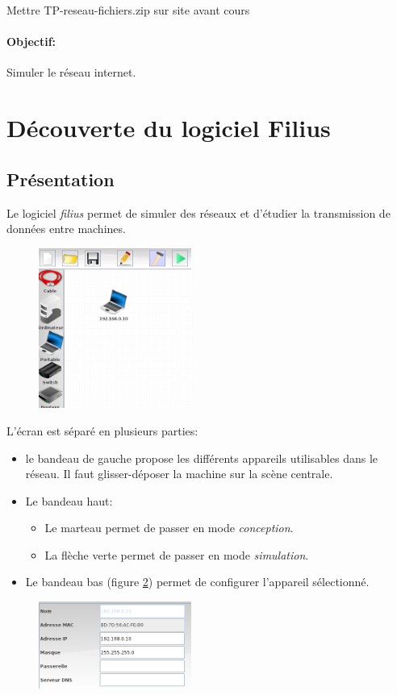 \documentclass[a4paper,11pt]{article}
\begin{document}
\begin{Form}
\begin{commentprof}
Mettre TP-reseau-fichiers.zip sur site avant cours
\end{commentprof}
\paragraph{Objectif:}Simuler le réseau internet.
\section{Découverte du logiciel Filius}
\subsection{Présentation}
Le logiciel \emph{filius} permet de simuler des réseaux et d'étudier la transmission de données entre machines.
\begin{figure}[!h]
\centering
\includegraphics[width=5cm]{ressources/filius-ecran.png}
\label{filius}
\end{figure}
L'écran est séparé en plusieurs parties:
\begin{itemize}
\item le bandeau de gauche propose les différents appareils utilisables dans le réseau. Il faut glisser-déposer la machine sur la scène centrale.
\item Le bandeau haut:
\begin{itemize}
\item Le marteau permet de passer en mode \emph{conception}.
\item La flèche verte permet de passer en mode \emph{simulation}.
\end{itemize}
\item Le bandeau bas (figure \ref{config}) permet de configurer l'appareil sélectionné.
\end{itemize}
\begin{figure}[!h]
\centering
\includegraphics[width=5cm]{ressources/config-pc.png}
\label{config}
\end{figure}

\end{Form}
\end{document}
